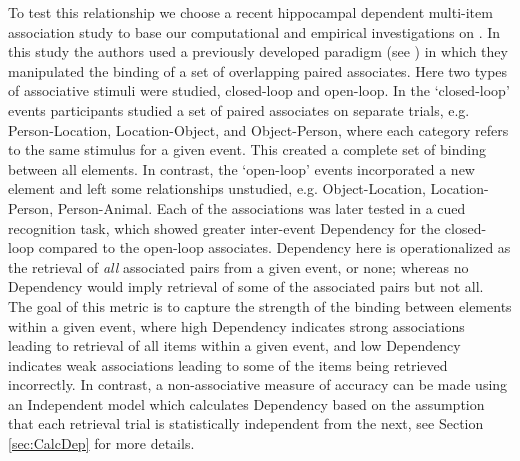 \documentclass[11pt, titlepage, twoside]{article}
\begin{document}
To test this relationship we choose a recent hippocampal dependent multi-item association study to base our computational and empirical investigations on \cite{HornerBisbyBushEtAl15}.  In this study the authors used a previously developed paradigm (see \textcite{HornerBurgess13,HornerBurgess14}) in which they manipulated the binding of a set of overlapping paired associates.   Here two types of associative stimuli were studied, closed-loop and open-loop. In the `closed-loop' events participants studied a set of paired associates on separate trials, e.g. Person-Location, Location-Object, and Object-Person, where each category refers to the same stimulus for a given event.  This created a complete set of binding between all elements.   In contrast, the `open-loop' events incorporated a new element and left some relationships unstudied, e.g. Object-Location, Location-Person, Person-Animal.  Each of the associations was later tested in a cued recognition task, which showed greater inter-event Dependency for the closed-loop compared to the open-loop associates.  Dependency here is operationalized as the retrieval of \emph{all} associated pairs from a given event, or none; whereas no Dependency would imply retrieval of some of the associated pairs but not all.  The goal of this metric is to capture the strength of the binding between elements within a given event, where high Dependency indicates strong associations leading to retrieval of all items within a given event, and low Dependency indicates weak associations leading to some of the items being retrieved incorrectly. In contrast, a non-associative measure of accuracy can be made using an Independent model which calculates Dependency based on the assumption that each retrieval trial is statistically independent from the next, see Section \ref{sec:CalcDep} for more details.  %
\end{document}

